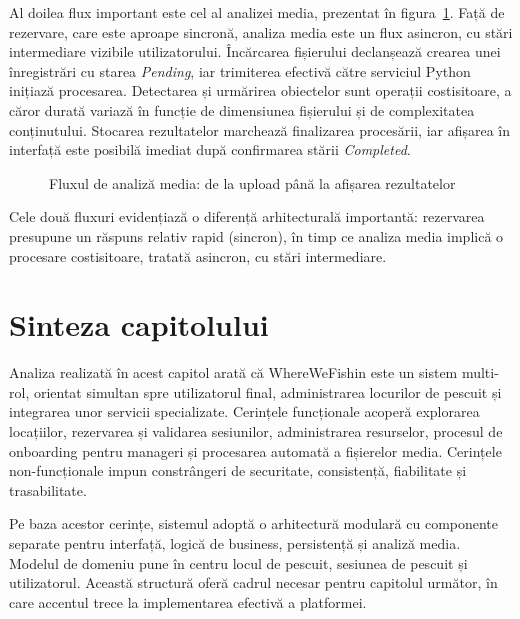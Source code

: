 Al doilea flux important este cel al analizei media, prezentat în figura~\ref{fig:flux-analiza-media}. Față de rezervare, care este aproape sincronă, analiza media este un flux asincron, cu stări intermediare vizibile utilizatorului. Încărcarea fișierului declanșează crearea unei înregistrări cu starea \emph{Pending}, iar trimiterea efectivă către serviciul Python inițiază procesarea. Detectarea și urmărirea obiectelor sunt operații costisitoare, a căror durată variază în funcție de dimensiunea fișierului și de complexitatea conținutului. Stocarea rezultatelor marchează finalizarea procesării, iar afișarea în interfață este posibilă imediat după confirmarea stării \emph{Completed}.

\begin{figure}[htbp]
\centering
{}
\caption{Fluxul de analiză media: de la upload până la afișarea rezultatelor}
\label{fig:flux-analiza-media}
\end{figure}

Cele două fluxuri evidențiază o diferență arhitecturală importantă: rezervarea presupune un răspuns relativ rapid (sincron), în timp ce analiza media implică o procesare costisitoare, tratată asincron, cu stări intermediare.

\section{Sinteza capitolului}

Analiza realizată în acest capitol arată că WhereWeFishin este un sistem multi-rol, orientat simultan spre utilizatorul final, administrarea locurilor de pescuit și integrarea unor servicii specializate. Cerințele funcționale acoperă explorarea locațiilor, rezervarea și validarea sesiunilor, administrarea resurselor, procesul de onboarding pentru manageri și procesarea automată a fișierelor media. Cerințele non-funcționale impun constrângeri de securitate, consistență, fiabilitate și trasabilitate.

Pe baza acestor cerințe, sistemul adoptă o arhitectură modulară cu componente separate pentru interfață, logică de business, persistență și analiză media. Modelul de domeniu pune în centru locul de pescuit, sesiunea de pescuit și utilizatorul. Această structură oferă cadrul necesar pentru capitolul următor, în care accentul trece la implementarea efectivă a platformei.
